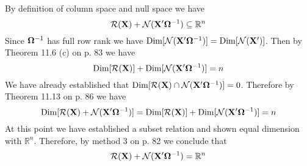 \bigskip
\noindent
By definition of column space and null space we have
$${\cal R}({\bf X})+{\cal N}({\bf X}'{\bf\Omega}^{-1})\subseteq
\mathbb{R}^n$$
Since
${\bf\Omega}^{-1}$ has full row rank we have
$\mathop{\rm Dim}[{\cal N}({\bf X}'{\bf\Omega}^{-1})]
=\mathop{\rm Dim}[{\cal N}({\bf X}')]$.
Then by Theorem 11.6 (c) on p. 83 we have
$$\mathop{\rm Dim}[{\cal R}({\bf X})]
+\mathop{\rm Dim}[{\cal N}({\bf X}'{\bf\Omega}^{-1})]=n$$
We have already established that
$\mathop{\rm Dim}[{\cal R}({\bf X})\cap
{\cal N}({\bf X}'{\bf\Omega}^{-1})]=0$.
Therefore by Theorem 11.13 on p. 86 we have
$$
\mathop{\rm Dim}[{\cal R}({\bf X})+{\cal N}({\bf X}'{\bf\Omega}^{-1})]
=\mathop{\rm Dim}[{\cal R}({\bf X})]
+\mathop{\rm Dim}[{\cal N}({\bf X}'{\bf\Omega}^{-1})]=n
$$
At this point
we have established a subset relation and shown equal dimension
with $\mathbb{R}^n$.
Therefore, by method 3 on p. 82 we conclude that
$${\cal R}({\bf X})+{\cal N}({\bf X}'{\bf\Omega}^{-1})=\mathbb{R}^n$$



